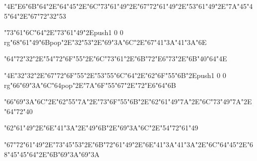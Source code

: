 \centerline{\ipa\char"4E\ipa\char"E6\ipa\char"6B\ipa\char"64\ipa\char"2E\ipa\char"64\ipa\char"45\ipa\char"2E\ipa\char"6C\ipa\char"73\ipa\char"61\ipa\char"49\ipa\char"2E\ipa\char"67\ipa\char"72\ipa\char"61\ipa\char"49\ipa\char"2E\ipa\char"53\ipa\char"61\ipa\char"49\ipa\char"2E\ipa\char"7A\ipa\char"45\ipa\char"45\ipa\char"64\ipa\char"2E\ipa\char"67\ipa\char"72\ipa\char"32\ipa\char"53}\bigskip
\centerline{\ipa\char"73\ipa\char"61\ipa\char"6C\ipa\char"64\ipa\char"2E\ipa\char"73\ipa\char"61\ipa\char"49\ipa\char"2E\pdfcolorstack\match push{1 0 0 rg}\ipa\char"68\ipa\char"61\ipa\char"49\ipa\char"6B\pdfcolorstack\match pop{}\ipa\char"2E\ipa\char"32\ipa\char"53\ipa\char"2E\ipa\char"69\ipa\char"3A\ipa\char"6C\ipa\char"2E\ipa\char"67\ipa\char"41\ipa\char"3A\ipa\char"41\ipa\char"3A\ipa\char"6E}
\vfill\eject
\null\vfill
\centerline{\ipa\char"64\ipa\char"72\ipa\char"32\ipa\char"2E\ipa\char"54\ipa\char"72\ipa\char"6F\ipa\char"55\ipa\char"2E\ipa\char"6C\ipa\char"73\ipa\char"61\ipa\char"2E\ipa\char"6B\ipa\char"72\ipa\char"E6\ipa\char"73\ipa\char"2E\ipa\char"6B\ipa\char"40\ipa\char"64\ipa\char"4E}\bigskip
\centerline{\ipa\char"4E\ipa\char"32\ipa\char"32\ipa\char"2E\ipa\char"67\ipa\char"72\ipa\char"6F\ipa\char"55\ipa\char"2E\ipa\char"53\ipa\char"55\ipa\char"6C\ipa\char"64\ipa\char"2E\ipa\char"62\ipa\char"6F\ipa\char"55\ipa\char"6B\ipa\char"2E\pdfcolorstack\match push{1 0 0 rg}\ipa\char"66\ipa\char"69\ipa\char"3A\ipa\char"6C\ipa\char"64\pdfcolorstack\match pop{}\ipa\char"2E\ipa\char"7A\ipa\char"6F\ipa\char"55\ipa\char"67\ipa\char"2E\ipa\char"72\ipa\char"E6\ipa\char"64\ipa\char"6B}\bigskip
\centerline{\ipa\char"66\ipa\char"69\ipa\char"3A\ipa\char"6C\ipa\char"2E\ipa\char"62\ipa\char"55\ipa\char"7A\ipa\char"2E\ipa\char"73\ipa\char"6F\ipa\char"55\ipa\char"6B\ipa\char"2E\ipa\char"62\ipa\char"61\ipa\char"49\ipa\char"7A\ipa\char"2E\ipa\char"6C\ipa\char"73\ipa\char"49\ipa\char"7A\ipa\char"2E\ipa\char"64\ipa\char"72\ipa\char"40}
\vfill\eject
\null\vfill
\centerline{\ipa\char"62\ipa\char"61\ipa\char"49\ipa\char"2E\ipa\char"6E\ipa\char"41\ipa\char"3A\ipa\char"2E\ipa\char"49\ipa\char"6B\ipa\char"2E\ipa\char"69\ipa\char"3A\ipa\char"6C\ipa\char"2E\ipa\char"54\ipa\char"72\ipa\char"61\ipa\char"49}\bigskip
\centerline{\ipa\char"67\ipa\char"72\ipa\char"61\ipa\char"49\ipa\char"2E\ipa\char"73\ipa\char"45\ipa\char"53\ipa\char"2E\ipa\char"6B\ipa\char"72\ipa\char"61\ipa\char"49\ipa\char"2E\ipa\char"6E\ipa\char"41\ipa\char"3A\ipa\char"41\ipa\char"3A\ipa\char"2E\ipa\char"6C\ipa\char"64\ipa\char"45\ipa\char"2E\ipa\char"68\ipa\char"45\ipa\char"45\ipa\char"64\ipa\char"2E\ipa\char"6B\ipa\char"69\ipa\char"3A\ipa\char"69\ipa\char"3A}\bigskip
